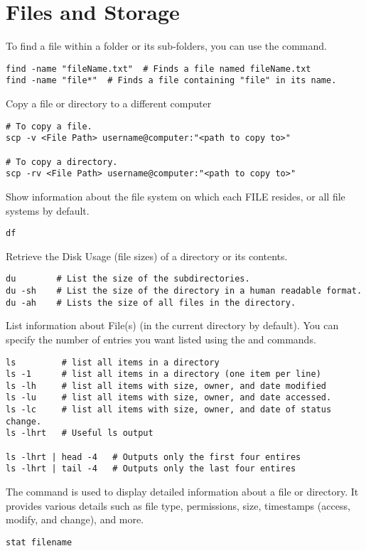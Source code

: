 \section{Files and Storage}

To find a file within a folder or its sub-folders, you can use the  command.
\begin{lstlisting}
find -name "fileName.txt"  # Finds a file named fileName.txt
find -name "file*"  # Finds a file containing "file" in its name.
\end{lstlisting}

Copy a file or directory to a different computer
\begin{lstlisting}
# To copy a file.
scp -v <File Path> username@computer:"<path to copy to>"

# To copy a directory.
scp -rv <File Path> username@computer:"<path to copy to>"
\end{lstlisting}

Show information about the file system on which each FILE resides, or all file systems by default.
\begin{lstlisting}
df 
\end{lstlisting}

Retrieve the Disk Usage (file sizes) of a directory or its contents.
\begin{lstlisting}
du        # List the size of the subdirectories.
du -sh    # List the size of the directory in a human readable format.
du -ah    # Lists the size of all files in the directory.
\end{lstlisting}

List information about File(s) (in the current directory by default). You can specify the number of entries you want listed using the  and  commands.
\begin{lstlisting}
ls         # list all items in a directory
ls -1      # list all items in a directory (one item per line)
ls -lh     # list all items with size, owner, and date modified
ls -lu     # list all items with size, owner, and date accessed.
ls -lc     # list all items with size, owner, and date of status change. 
ls -lhrt   # Useful ls output

ls -lhrt | head -4	 # Outputs only the first four entires
ls -lhrt | tail -4	 # Outputs only the last four entires
\end{lstlisting}

The  command is used to display detailed information about a file or directory. It provides various details such as file type, permissions, size, timestamps (access, modify, and change), and more.
\begin{lstlisting}
stat filename
\end{lstlisting}

